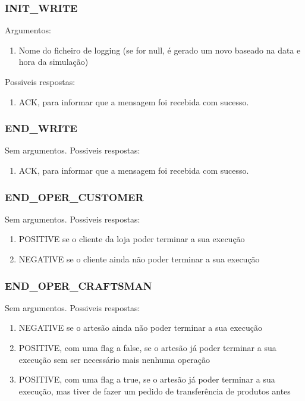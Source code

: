 \documentclass[11pt,a4paper]{report}
\begin{document}
\subsubsection{INIT\_WRITE}
Argumentos:
\begin{enumerate}
    \itemsep-0.4em
    \item Nome do ficheiro de logging (se for null, é gerado um novo baseado na data e hora da simulação)
\end{enumerate}
Possiveis respostas:
\begin{enumerate}
    \itemsep-0.4em
    \item ACK, para informar que a mensagem foi recebida com sucesso.
\end{enumerate}

\subsubsection{END\_WRITE}
Sem argumentos.
Possiveis respostas:
\begin{enumerate}
    \itemsep-0.4em
    \item ACK, para informar que a mensagem foi recebida com sucesso.
\end{enumerate}

\subsubsection{END\_OPER\_CUSTOMER}
Sem argumentos.
Possiveis respostas:
\begin{enumerate}
    \itemsep-0.4em
    \item POSITIVE se o cliente da loja poder terminar a sua execução
    \item NEGATIVE se o cliente ainda não poder terminar a sua execução
\end{enumerate}

\subsubsection{END\_OPER\_CRAFTSMAN}
Sem argumentos.
Possiveis respostas:
\begin{enumerate}
    \itemsep-0.4em
    \item NEGATIVE se o artesão ainda não poder terminar a sua execução
    \item POSITIVE, com uma flag a false, se o artesão já poder terminar a sua execução sem ser necessário mais nenhuma operação
    \item POSITIVE, com uma flag a true, se o artesão já poder terminar a sua execução, mas tiver de fazer um pedido de transferência de produtos antes
\end{enumerate}
\end{document}
